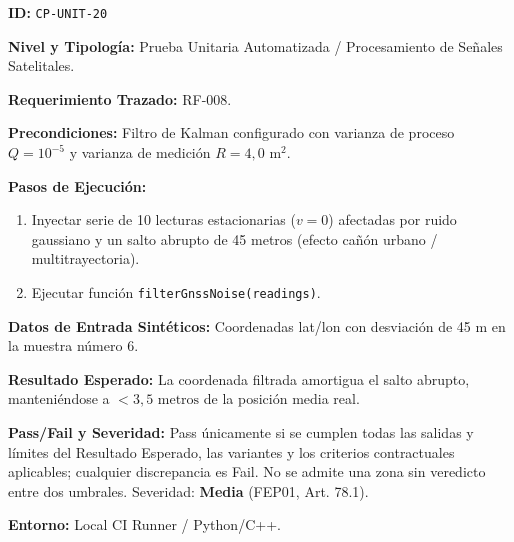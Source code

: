 \par\noindent\textbf{ID:} \texttt{C\allowbreak{}P\allowbreak{}-\allowbreak{}U\allowbreak{}N\allowbreak{}I\allowbreak{}T\allowbreak{}-\allowbreak{}2\allowbreak{}0\allowbreak{}}\par
\par\noindent\textbf{Nivel y Tipología:} Prueba Unitaria Automatizada / Procesamiento de Señales Satelitales.\par
\par\noindent\textbf{Requerimiento Trazado:} RF-008.\par
\par\noindent\textbf{Precondiciones:} Filtro de Kalman configurado con varianza de proceso \(Q = 10^{-5}\) y varianza de medición \(R = 4{,}0\text{ m}^2\).\par
\par\noindent\textbf{Pasos de Ejecución:} \par
\begin{enumerate}
\item Inyectar serie de 10 lecturas estacionarias (\(v = 0\)) afectadas por ruido gaussiano y un salto abrupto de 45 metros (efecto cañón urbano / multitrayectoria).
\item Ejecutar función \texttt{f\allowbreak{}i\allowbreak{}l\allowbreak{}t\allowbreak{}e\allowbreak{}r\allowbreak{}G\allowbreak{}n\allowbreak{}s\allowbreak{}s\allowbreak{}N\allowbreak{}o\allowbreak{}i\allowbreak{}s\allowbreak{}e\allowbreak{}(\allowbreak{}r\allowbreak{}e\allowbreak{}a\allowbreak{}d\allowbreak{}i\allowbreak{}n\allowbreak{}g\allowbreak{}s\allowbreak{})\allowbreak{}}.
\end{enumerate}
\par\noindent\textbf{Datos de Entrada Sintéticos:} Coordenadas lat/lon con desviación de 45 m en la muestra número 6.\par
\par\noindent\textbf{Resultado Esperado:} La coordenada filtrada amortigua el salto abrupto, manteniéndose a \(< 3{,}5\text{ metros}\) de la posición media real.\par
\par\noindent\textbf{Pass/Fail y Severidad:} Pass únicamente si se cumplen todas las salidas y límites del Resultado Esperado, las variantes y los criterios contractuales aplicables; cualquier discrepancia es Fail. No se admite una zona sin veredicto entre dos umbrales. Severidad: \textbf{Media} (FEP01, Art. 78.1).\par
\par\noindent\textbf{Entorno:} Local CI Runner / Python/C++.\par






